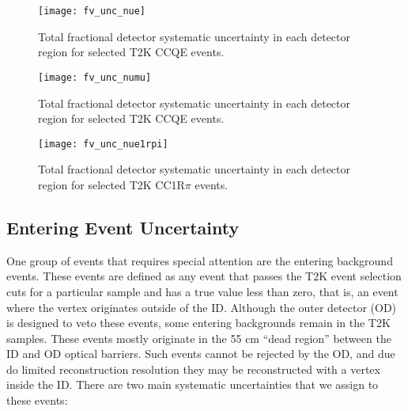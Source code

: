\begin{figure}[h]
  \begin{center}
    \texttt{[image: fv\_unc\_nue]}
  \end{center}
  \caption{Total fractional detector systematic uncertainty in each detector region for selected
  T2K \nue CCQE events.}
  \label{fig:fverrnue}
\end{figure}

\begin{figure}[h]
  \begin{center}
    \texttt{[image: fv\_unc\_numu]}
  \end{center}
  \caption{Total fractional detector systematic uncertainty in each detector region for selected
  T2K \numu CCQE events.}
  \label{fig:fverrnumu}
\end{figure}

\begin{figure}[h]
  \begin{center}
    \texttt{[image: fv\_unc\_nue1rpi]}
  \end{center}
  \caption{Total fractional detector systematic uncertainty in each detector region for selected
  T2K \nue CC1R$\pi$ events.}
  \label{fig:fverrnue1rpi}
\end{figure}



\subsection{Entering Event Uncertainty}
\label{subsec:entering}

One group of events that requires special attention are the entering background
events.  These events are defined as any event that passes
the T2K event selection cuts for a particular sample and has a true \wall
value less than zero, that is, an event where the vertex originates outside of
the ID\@.  Although the outer detector (OD) is designed to veto these events,
some entering backgrounds remain in the T2K samples.  These events mostly
originate in the 55 cm ``dead region'' between the ID and OD optical barriers.
Such events cannot be rejected by the OD, and due do limited reconstruction
resolution they may be reconstructed with a vertex inside the ID\@.  
There are two main systematic uncertainties that we assign to these events:

